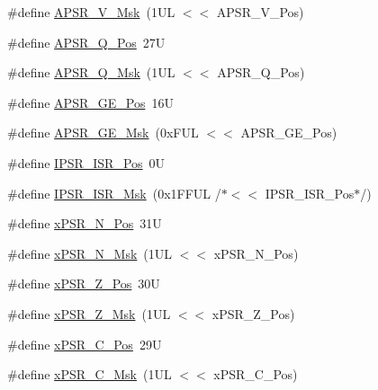 \begin{DoxyCompactItemize}
\item 
\#define \mbox{\hyperlink{group___c_m_s_i_s___c_o_r_e_ga33305d6701356bff6890b315fe8b5489}{A\+P\+S\+R\+\_\+\+V\+\_\+\+Msk}}~(1\+U\+L $<$$<$ A\+P\+S\+R\+\_\+\+V\+\_\+\+Pos)
\item 
\#define \mbox{\hyperlink{group___c_m_s_i_s___c_o_r_e_ga298749e176f12827328bb7b92a6b2411}{A\+P\+S\+R\+\_\+\+Q\+\_\+\+Pos}}~27U
\item 
\#define \mbox{\hyperlink{group___c_m_s_i_s___c_o_r_e_ga90ffd4ec4149c2f5dd7747c1533fb002}{A\+P\+S\+R\+\_\+\+Q\+\_\+\+Msk}}~(1\+U\+L $<$$<$ A\+P\+S\+R\+\_\+\+Q\+\_\+\+Pos)
\item 
\#define \mbox{\hyperlink{group___c_m_s_i_s___c_o_r_e_ga722cb42b5c75af3e8909fac6fd40dfdc}{A\+P\+S\+R\+\_\+\+G\+E\+\_\+\+Pos}}~16U
\item 
\#define \mbox{\hyperlink{group___c_m_s_i_s___c_o_r_e_ga8a3ecbc0ea2029462b0f4ce50e227db1}{A\+P\+S\+R\+\_\+\+G\+E\+\_\+\+Msk}}~(0x\+F\+U\+L $<$$<$ A\+P\+S\+R\+\_\+\+G\+E\+\_\+\+Pos)
\item 
\#define \mbox{\hyperlink{group___c_m_s_i_s___c_o_r_e_ga0e34027584d02c43811ae908a5ca9adf}{I\+P\+S\+R\+\_\+\+I\+S\+R\+\_\+\+Pos}}~0U
\item 
\#define \mbox{\hyperlink{group___c_m_s_i_s___c_o_r_e_gaf013a4579a64d1f21f56ea9f1b33ab56}{I\+P\+S\+R\+\_\+\+I\+S\+R\+\_\+\+Msk}}~(0x1\+F\+F\+U\+L /$\ast$$<$$<$ I\+P\+S\+R\+\_\+\+I\+S\+R\+\_\+\+Pos$\ast$/)
\item 
\#define \mbox{\hyperlink{group___c_m_s_i_s___c_o_r_e_ga031eb1b8ebcdb3d602d0b9f2ec82a7ae}{x\+P\+S\+R\+\_\+\+N\+\_\+\+Pos}}~31U
\item 
\#define \mbox{\hyperlink{group___c_m_s_i_s___c_o_r_e_gaf600f4ff41b62cf2f3b0a59b6d2e93d6}{x\+P\+S\+R\+\_\+\+N\+\_\+\+Msk}}~(1\+U\+L $<$$<$ x\+P\+S\+R\+\_\+\+N\+\_\+\+Pos)
\item 
\#define \mbox{\hyperlink{group___c_m_s_i_s___c_o_r_e_ga5869dd608eea73c80f0567d781d2230b}{x\+P\+S\+R\+\_\+\+Z\+\_\+\+Pos}}~30U
\item 
\#define \mbox{\hyperlink{group___c_m_s_i_s___c_o_r_e_ga907599209fba99f579778e662021c4f2}{x\+P\+S\+R\+\_\+\+Z\+\_\+\+Msk}}~(1\+U\+L $<$$<$ x\+P\+S\+R\+\_\+\+Z\+\_\+\+Pos)
\item 
\#define \mbox{\hyperlink{group___c_m_s_i_s___c_o_r_e_ga14adb79b91f6634b351a1b57394e2db6}{x\+P\+S\+R\+\_\+\+C\+\_\+\+Pos}}~29U
\item 
\#define \mbox{\hyperlink{group___c_m_s_i_s___c_o_r_e_ga21e2497255d380f956ca0f48d11d0775}{x\+P\+S\+R\+\_\+\+C\+\_\+\+Msk}}~(1\+U\+L $<$$<$ x\+P\+S\+R\+\_\+\+C\+\_\+\+Pos)

\end{DoxyCompactItemize}
